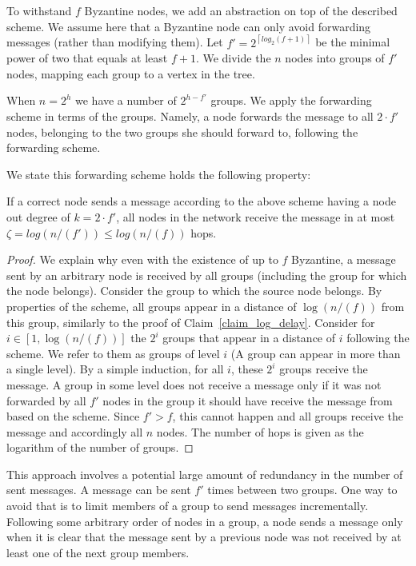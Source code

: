  
To withstand $f$ Byzantine nodes, we add an abstraction on top of the described scheme. 
We assume here that a Byzantine node can only avoid forwarding messages (rather than modifying them). Let $f' = 2^ {\left \lceil log_2 (f+1) \right \rceil}$ be the minimal power of two that equals at least $f+1$.   
We divide the $n$ nodes into groups of $f'$ nodes, mapping each group to a vertex in the tree. 

When $n = 2^h$ we have a number of  $2^{h - f'}$ groups.
We apply the forwarding scheme in terms of the groups. Namely, a node forwards the message to all $2 \cdot f'$ nodes, belonging to the two groups she should forward to, following the forwarding scheme.

We state this forwarding scheme holds the following property:
\begin{claim}{}
\label{frf_correctness}
If a correct node sends a message  according to the above scheme having a node out degree of $k=2\cdot f'$, all  nodes in the network receive the message in at most $\zeta=log(n/(f')) \le log(n/(f))$ hops.
\end{claim} 
\begin{proof}
We explain why even with the existence of up to $f$ Byzantine, a message sent by an arbitrary node is received by all groups (including the group for which the node belongs). Consider the group to which the source node belongs.   By properties of the scheme, all groups appear in a distance of $\log(n/(f))$ from this group, similarly to the proof of Claim~\ref{claim_log_delay}. Consider for $i \in [1,\log(n/(f))]$ the $2^i$ groups that appear in a distance of $i$ following the scheme. We refer to them as groups of level $i$ (A group can appear in more than a single level). By a simple induction, for all $i$, these $2^i$ groups receive the message. A group in some level does not receive a message only if it was not forwarded by all $f'$ nodes in the group it should have receive the message from based on the scheme. Since $f' > f$, this cannot happen and all groups receive the message and accordingly all $n$ nodes. The number of hops is given as the logarithm of the number of groups.  
\end{proof}

This approach involves a potential large amount of redundancy in the number of sent messages. A message can be sent $f'$ times between two groups. One way to avoid that is to limit members of a group to send messages incrementally. Following some arbitrary order of nodes in a group, a node sends a message only when it is clear that the message sent by a previous node was not received by at least one of the next group members. 




